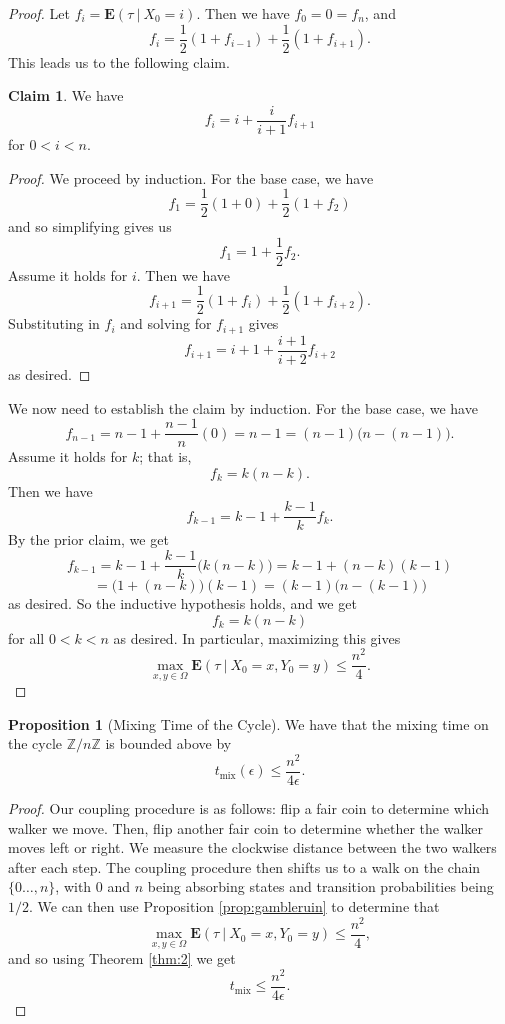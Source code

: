 \documentclass[10pt,a4paper]{amsart}
\theoremstyle{definition}
\numberwithin{definition}{section}
\newtheorem{claim}[definition]{Claim}
\newtheorem{proposition}[definition]{Proposition}
\begin{document}
\begin{proof}
Let $f_i = \mathbf{E}(\tau \ | \ X_0 = i)$. Then we have $f_0 = 0 = f_n$, and 
\[f_i = \frac{1}{2}(1+f_{i-1}) + \frac{1}{2}(1+f_{i+1}). \]
This leads us to the following claim.
\begin{claim}
We have 
\[ f_i = i + \frac{i}{i+1} f_{i+1}\]
for $0 < i < n$.
\end{claim}

\begin{proof}
We proceed by induction. For the base case, we have 
\[f_1 = \frac{1}{2}(1+0) + \frac{1}{2}(1+f_2) \]
and so simplifying gives us 
\[f_1 = 1 + \frac{1}{2} f_2. \]
Assume it holds for $i$. Then we have
\[ f_{i+1} = \frac{1}{2}(1+f_i) + \frac{1}{2}(1+f_{i+2}).\]
Substituting in $f_i$ and solving for $f_{i+1}$ gives
\[f_{i+1} = i+1 + \frac{i+1}{i+2}f_{i+2} \]
as desired.
\end{proof}

We now need to establish the claim by induction. For the base case, we have
\[f_{n-1} = n-1 + \frac{n-1}{n} (0) = n-1 = (n-1)\big(n-(n-1)\big). \]
Assume it holds for $k$; that is,
\[f_k = k(n-k). \] 
Then we have
\[f_{k-1} = k-1 + \frac{k-1}{k} f_k. \]
By the prior claim, we get 
\[f_{k-1} = k-1 + \frac{k-1}{k} \big(k(n-k)\big) = k-1 + (n-k)(k-1)\]
\[= \big(1+(n-k)\big)(k-1) = (k-1)\big(n-(k-1)\big) \]
as desired. So the inductive hypothesis holds, and we get 
\[ f_k = k(n-k)\]
for all $0 < k < n$ as desired. In particular, maximizing this gives 
\[\max_{x,y \in \Omega} \mathbf{E}(\tau \ | \ X_0 = x, Y_0 = y) \leq \frac{n^2}{4}.\]
\end{proof}

\begin{proposition}[Mixing Time of the Cycle]
We have that the mixing time on the cycle $\mathbb{Z}/n\mathbb{Z}$ is bounded above by
\[ t_{\text{mix}}(\epsilon) \leq \frac{n^2}{4\epsilon}.\]
\end{proposition}

\begin{proof}
Our coupling procedure is as follows: flip a fair coin to determine which walker we move. Then, flip another fair coin to determine whether the walker moves left or right. We measure the clockwise distance between the two walkers after each step. The coupling procedure then shifts us to a walk on the chain $\{0 \ldots, n\}$, with $0$ and $n$ being absorbing states and transition probabilities being $1/2$. We can then use Proposition \ref{prop:gambleruin} to determine that 
\[ \max_{x,y \in \Omega} \mathbf{E}(\tau \ | \ X_0 = x, Y_0 =y) \leq \frac{n^2}{4}, \]
and so using Theorem \ref{thm:2} we get 
\[t_{\text{mix}} \leq \frac{n^2}{4\epsilon}. \]
\end{proof}



\end{document}
